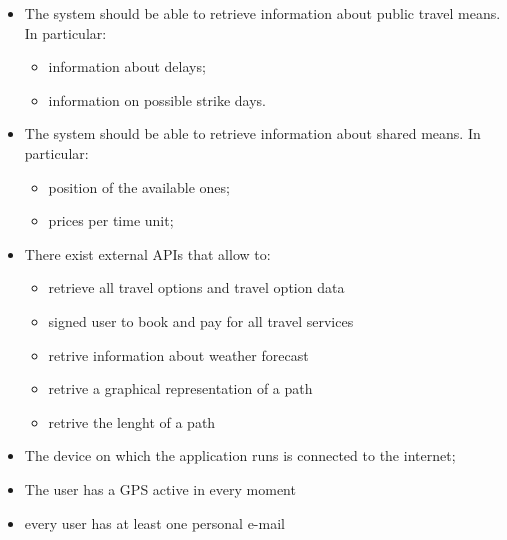 \begin{itemize}

\item The system should be able to retrieve information about public travel means. In particular:
\begin{itemize}
\item information about delays;
\item information on possible strike days.
\end{itemize}

\item The system should be able to retrieve information about shared means. In particular:
\begin{itemize}
\item position of the available ones;
\item prices per time unit;
\end{itemize}

\item There exist external APIs that allow to:
\begin{itemize}
\item retrieve all travel options and travel option data
\item signed user to book and pay for all travel services
\item retrive information about weather forecast
\item retrive a graphical representation of a path
\item retrive the lenght of a path
\end{itemize}

\item The device on which the application runs is connected to the internet;

\item The user has a GPS active in every moment

\item every user has at least one personal e-mail 

\end{itemize}




